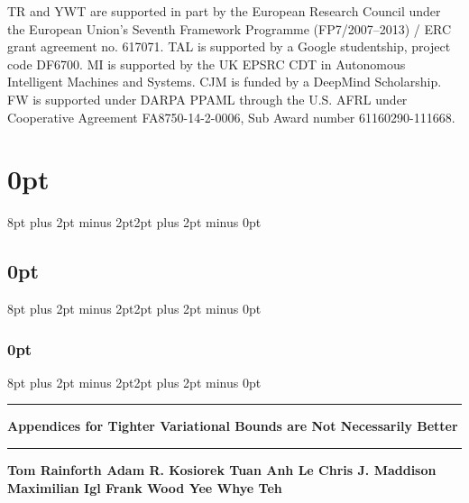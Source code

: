 \documentclass{article}
\begin{document}
TR and YWT are supported in part by the European Research Council under the European Union's Seventh Framework Programme (FP7/2007--2013) / ERC grant agreement no. 617071. 
TAL is supported by a Google studentship, project code DF6700.
MI is supported by the UK EPSRC CDT in Autonomous Intelligent Machines
and Systems.
CJM is funded by a DeepMind Scholarship.
FW is supported under DARPA PPAML through the U.S. AFRL
under Cooperative Agreement FA8750-14-2-0006, Sub Award number 61160290-111668.



\clearpage

\appendix
	\onecolumn
\setlength{\abovedisplayskip}{5pt}
\setlength{\belowdisplayskip}{5pt}
\setlength{\abovedisplayshortskip}{5pt}
\setlength{\belowdisplayshortskip}{5pt}

\titlespacing\section{0pt}{8pt plus 2pt minus 2pt}{2pt plus 2pt minus 0pt}
\titlespacing\subsection{0pt}{8pt plus 2pt minus 2pt}{2pt plus 2pt minus 0pt}
\titlespacing\subsubsection{0pt}{8pt plus 2pt minus 2pt}{2pt plus 2pt minus 0pt}

\thispagestyle{empty} 
\rule{\textwidth}{1pt}
\vspace{-6pt}
\begin{center}
	\textbf{ \Large  Appendices for Tighter Variational Bounds are Not Necessarily
		Better}
\end{center}%
\rule{\textwidth}{1pt}

	\begin{minipage}{\textwidth}
		\centering
		\vspace{17pt}
		\textbf{Tom Rainforth \quad Adam R. Kosiorek \quad Tuan Anh Le \quad Chris J. Maddison \\
		 Maximilian Igl \quad Frank Wood \quad Yee Whye Teh}
		\vspace{6pt}
	\end{minipage}
	
\renewcommand{\theequation}{\thesection.\arabic{equation}}  
\renewcommand\thefigure{\thesection.\arabic{figure}}  









%
%
\end{document}
